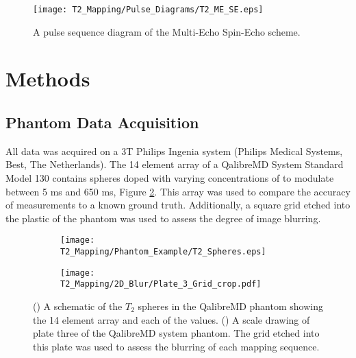 \begin{figure}[H]
	\centering
	\texttt{[image: T2\_Mapping/Pulse\_Diagrams/T2\_ME\_SE.eps]}
	\caption{A pulse sequence diagram of the Multi-Echo Spin-Echo scheme.}
	\label{fig:t2_me-se_seq}	
\end{figure}

\newpage

\section{Methods}
\label{sec:t2_methods}

\subsection{Phantom Data Acquisition}

All data was acquired on a 3T Philips Ingenia system (Philips Medical Systems, Best, The Netherlands). The 14 element \ttwo array of a QalibreMD System Standard Model 130 contains spheres doped with varying concentrations of  to modulate \ttwo between 5 ms and 650 ms, Figure \ref{fig:t2_phantom_schematic}. This array was used to compare the accuracy of \ttwo measurements to a known ground truth. Additionally, a square grid etched into the plastic of the phantom was used to assess the degree of image blurring. 

\begin{figure}[H]
\centering
\begin{subfigure}[c]{0.47\textwidth}
	\centering
	\texttt{[image: T2\_Mapping/Phantom\_Example/T2\_Spheres.eps]}
	\caption{}
	\label{fig:t2_phantom_schematic}
\end{subfigure}
\hfill
\begin{subfigure}[c]{0.47\textwidth}
	\centering
	\texttt{[image: T2\_Mapping/2D\_Blur/Plate\_3\_Grid\_crop.pdf]}
	\caption{}
	\label{fig:t2_blur_grid}
\end{subfigure}
\caption{() A schematic of the $T_2$ spheres in the QalibreMD phantom showing the 14 element \ttwo array and each of the \ttwo values. () A scale drawing of plate three of the QalibreMD system phantom. The grid etched into this plate was used to assess the blurring of each \ttwo mapping sequence.}
\label{fig:t2_nist_phantom}
\end{figure}

